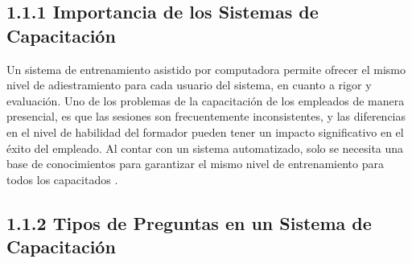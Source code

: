 \documentclass[12pt,a4paper]{report}
\begin{document}
\subsection*{1.1.1 Importancia de los Sistemas de Capacitación}
Un sistema de entrenamiento asistido por computadora permite ofrecer el mismo nivel de adiestramiento para cada usuario del sistema, en cuanto a rigor y evaluación. Uno de los problemas de la capacitación de los empleados de manera presencial, es que las sesiones son frecuentemente inconsistentes, y las diferencias en el nivel de habilidad del formador pueden tener un impacto significativo en el éxito del empleado. Al contar con un sistema automatizado, solo se necesita una base de conocimientos para garantizar el mismo nivel de entrenamiento para todos los capacitados \cite{cap2002}.

\subsection*{1.1.2 Tipos de Preguntas en un Sistema de Capacitación}


\nocite{*}


\end{document}
